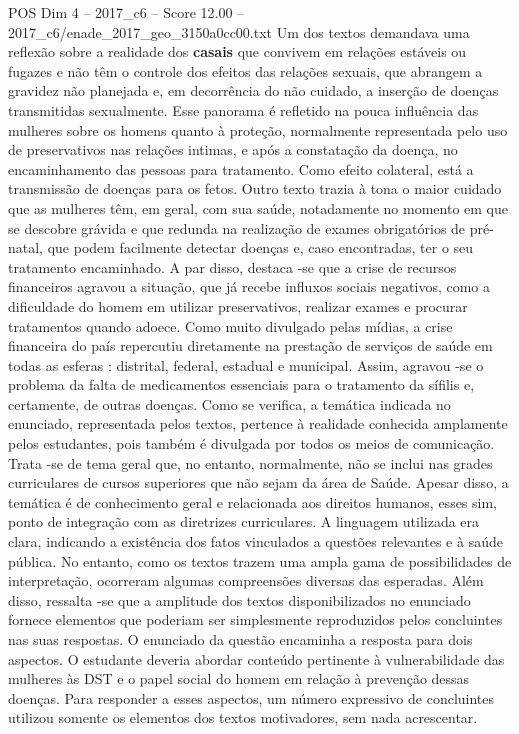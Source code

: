 \begin{textsample}{POS Dim 4 – 2017\_c6 – Score 12.00 – 2017\_c6/enade\_2017\_geo\_3150a0cc00.txt}
Um dos textos demandava uma reflexão sobre a realidade dos \textbf{casais} que convivem em relações estáveis ou fugazes e não têm o controle dos efeitos das relações sexuais, que abrangem a gravidez não planejada e, em decorrência do não cuidado, a inserção de doenças transmitidas sexualmente.
Esse panorama é refletido na pouca influência das mulheres sobre os homens quanto à proteção, normalmente representada pelo uso de preservativos nas relações intimas, e após a constatação da doença, no encaminhamento das pessoas para tratamento.
Como efeito colateral, está a transmissão de doenças para os fetos.
Outro texto trazia à tona o maior cuidado que as mulheres têm, em geral, com sua saúde, notadamente no momento em que se descobre grávida e que redunda na realização de exames obrigatórios de pré-natal, que podem facilmente detectar doenças e, caso encontradas, ter o seu tratamento encaminhado.
A par disso, destaca -se que a crise de recursos financeiros agravou a situação, que já recebe influxos sociais negativos, como a dificuldade do homem em utilizar preservativos, realizar exames e procurar tratamentos quando adoece.
Como muito divulgado pelas mídias, a crise financeira do país repercutiu diretamente na prestação de serviços de saúde em todas as esferas : distrital, federal, estadual e municipal.
Assim, agravou -se o problema da falta de medicamentos essenciais para o tratamento da sífilis e, certamente, de outras doenças.
Como se verifica, a temática indicada no enunciado, representada pelos textos, pertence à realidade conhecida amplamente pelos estudantes, pois também é divulgada por todos os meios de comunicação.
Trata -se de tema geral que, no entanto, normalmente, não se inclui nas grades curriculares de cursos superiores que não sejam da área de Saúde.
Apesar disso, a temática é de conhecimento geral e relacionada aos direitos humanos, esses sim, ponto de integração com as diretrizes curriculares.
A linguagem utilizada era clara, indicando a existência dos fatos vinculados a questões relevantes e à saúde pública.
No entanto, como os textos trazem uma ampla gama de possibilidades de interpretação, ocorreram algumas compreensões diversas das esperadas.
Além disso, ressalta -se que a amplitude dos textos disponibilizados no enunciado fornece elementos que poderiam ser simplesmente reproduzidos pelos concluintes nas suas respostas.
O enunciado da questão encaminha a resposta para dois aspectos.
O estudante deveria abordar conteúdo pertinente à vulnerabilidade das mulheres às DST e o papel social do homem em relação à prevenção dessas doenças.
Para responder a esses aspectos, um número expressivo de concluintes utilizou somente os elementos dos textos motivadores, sem nada acrescentar.

\end{textsample}
